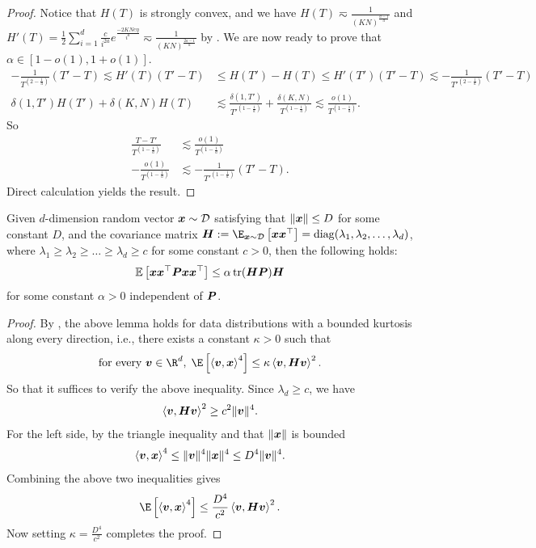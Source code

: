 \begin{proof}
Notice that $H(T)$ is strongly convex, and we have $H(T)\eqsim\frac{1}{(KN)^{\frac{a-1}{a}}}$ and $H'(T) = \frac{1}{2}\sum_{i=1}^{d}\frac{c}{i^{2a}}e^{\frac{-2KNc\eta}{i^{a}}}\eqsim\frac{1}{(KN)^{\frac{2a-1}{a}}}$ by . We are now ready to prove that $\alpha \in [1-o(1), 1+o(1)]$.
\begin{align*}
    -\frac{1}{T^{(2-\frac{1}{a})}}(T'-T)\lesssim H'(T)(T'-T)&\leq H(T')-H(T)\leq H'(T')(T'-T) \lesssim-\frac{1}{T'^{(2-\frac{1}{a})}}(T'-T)\\
    \delta(1,T')H(T')+\delta(K,N)H(T)&\lesssim \frac{\delta(1,T')}{T'^{(1-\frac{1}{a})}}+\frac{\delta(K,N)}{T^{(1-\frac{1}{a})}} \lesssim\frac{o(1)}{T^{(1-\frac{1}{a})}}.
\end{align*}
So 
\begin{align*}
    \frac{T-T'}{T^{(1-\frac{1}{a})}} &\lesssim \frac{o(1)}{T^{(1-\frac{1}{a})}} \\
    -\frac{o(1)}{T^{(1-\frac{1}{a})}}&\lesssim-\frac{1}{T'^{(1-\frac{1}{a})}}(T'-T).
\end{align*}
Direct calculation yields the result.
\end{proof}

\begin{lemma} \label{lem:4-th-moment}
Given $d$-dimension random vector ${\bm{x}} \sim \mathcal{D}$ satisfying that $\|{\bm{x}}\| \le D$ for some constant $D$, and the covariance matrix $\mH:= \E_{\vx \sim \cD}\left[\vx\vx^{\top}\right] = \diag(\lambda_1,\lambda_2,\dots,\lambda_d)$, where $\lambda_1 \ge \lambda_2 \ge \dots \ge \lambda_d \ge c$ for some constant $c>0$, then the following holds:
$$
\mathbb{E}\left[{\bm{x}} {\bm{x}}^\top {\bm{P}} {\bm{x}} {\bm{x}}^\top \right] \leq \alpha \, \text{tr}({\bm{H}} {\bm{P}}) {\bm{H}}
$$
for some constant $\alpha>0$ independent of ${\bm{P}}$.
\end{lemma}
\begin{proof}
    By \citet{dieuleveut2017harder}, the above lemma holds for data distributions with a bounded kurtosis along every direction, i.e., there exists a constant $\kappa > 0$ such that
    \begin{align*}
        \text{for every } \vv \in \R^d,\;\E\left[\inp{\vv}{\vx}^4\right] \le \kappa \inp{\vv}{\mH\vv}^2.
    \end{align*}
    So that it suffices to verify the above inequality. Since $\lambda_d \ge c$, we have 
    \begin{align*}
        \left\langle {\bm{v}},{\bm{H}}{\bm{v}}\right\rangle^2 \ge c^2 \|{\bm{v}}\|^4.
    \end{align*}
    For the left side, by the triangle inequality and that $\|{\bm{x}}\|$ is bounded 
    \begin{align*}
        \left\langle {\bm{v}},{\bm{x}}\right\rangle^4 \le \|{\bm{v}}\|^4 \|{\bm{x}}\|^4 \le D^4 \|{\bm{v}}\|^4 .
    \end{align*}
    Combining the above two inequalities gives
    \begin{align*}
        \E\left[\inp{\vv}{\vx}^4\right] \le \frac{D^4}{c^2} \inp{\vv}{\mH\vv}^2.
    \end{align*}
    Now setting $\kappa=\frac{D^4}{c^2}$ completes the proof.
\end{proof}


